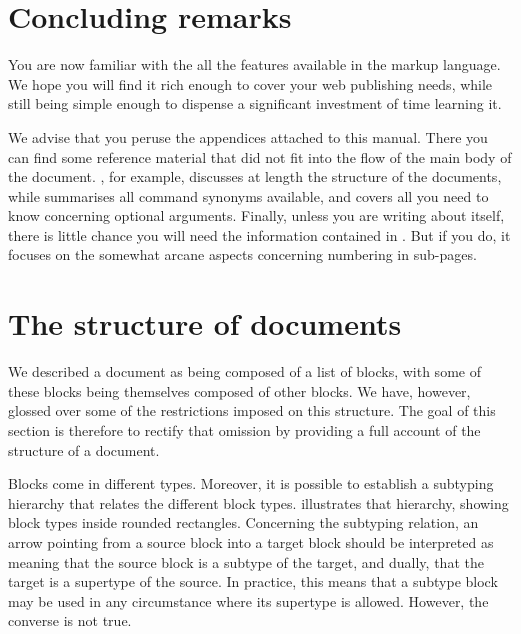\section{Concluding remarks}

You are now familiar with the all the features available in the \lambtex markup language.
We hope you will find it rich enough to cover your web publishing needs, while still
being simple enough to dispense a significant investment of time learning it.

We advise that you peruse the appendices attached to this manual.  There you can find
some reference material that did not fit into the flow of the main body of the document.
, for example, discusses at length the structure of the \lambtex
documents, while  summarises all command synonyms available,
and  covers all you need to know concerning optional arguments.
Finally, unless you are writing about \lambtex itself, there is little chance you will
need the information contained in .  But if you do, it focuses on the
somewhat arcane aspects concerning numbering in sub-pages.




\section[sec:structure]{The structure of \lambtex documents}

We described a \lambtex document as being composed of a list of blocks, with some
of these blocks being themselves composed of other blocks.  We have, however, glossed
over some of the restrictions imposed on this structure.  The goal of this section is
therefore to rectify that omission by providing a full account of the structure of a
\lambtex document.

Blocks come in different types.  Moreover, it is possible to establish a subtyping
hierarchy that relates the different block types.  illustrates that
hierarchy, showing block types inside rounded rectangles.  Concerning the subtyping
relation, an arrow pointing from a source block into a target block should be interpreted
as meaning that the source block is a subtype of the target, and dually, that the target
is a supertype of the source.  In practice, this means that a subtype block may be used
in any circumstance where its supertype is allowed.  However, the converse is not true.

